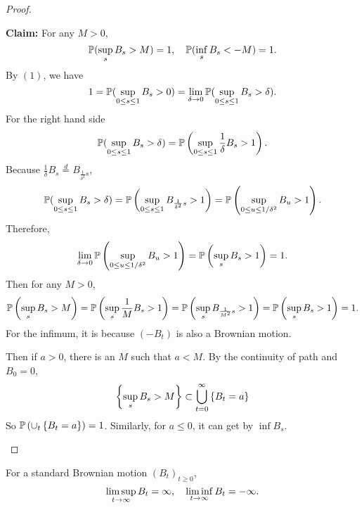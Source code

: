 \begin{proof}
\begin{enumerate}[label=(\arabic{*})]
        \noindent \textbf{Claim:} For any $M > 0$,
        \begin{equation*}
            \mathbb{P}(\sup_s B_s > M) = 1,\quad \mathbb{P}(\inf_s B_s < -M) = 1.
        \end{equation*}
        By $(1)$, we have
        \begin{equation*}
            1 = \mathbb{P}(\sup_{0 \leq s \leq 1} B_s > 0) = \lim_{\delta \rightarrow 0} \mathbb{P}(\sup_{0 \leq s \leq 1} B_s > \delta).
        \end{equation*}
        For the right hand side
        \begin{equation*}
            \mathbb{P}(\sup_{0 \leq s \leq 1} B_s > \delta) = \mathbb{P}\left(\sup_{0 \leq s \leq 1} \frac{1}{\delta} B_s > 1\right).
        \end{equation*}
        Because $\frac{1}{\delta} B_s \stackrel{d}{=} B_{\frac{1}{\delta^2}s}$,
        \begin{equation*}
            \mathbb{P}(\sup_{0 \leq s \leq 1} B_s > \delta) = \mathbb{P}\left(\sup_{0 \leq s \leq 1} B_{\frac{1}{\delta^2}s} > 1\right) = \mathbb{P}\left(\sup_{0 \leq u \leq {1}/{\delta^2}} B_{u} > 1\right).
        \end{equation*}
        Therefore,
        \begin{equation*}
            \lim_{\delta \rightarrow 0} \mathbb{P}\left(\sup_{0 \leq u \leq {1}/{\delta^2}} B_{u} > 1\right) = \mathbb{P}\left(\sup_s B_s > 1\right) = 1.
        \end{equation*}
        Then for any $M > 0$, 
        \begin{equation*}
            \mathbb{P}\left(\sup_s B_s > M\right) = \mathbb{P}\left(\sup_s \frac{1}{M}B_s > 1\right) = \mathbb{P}\left(\sup_s B_{\frac{1}{M^2}s} > 1\right) =  \mathbb{P}\left(\sup_s B_s > 1\right) = 1.
        \end{equation*}
        For the infimum, it is because $(-B_t)$ is also a Brownian motion.


        \noindent Then if $a > 0$, there is an $M$ such that $a < M$. By the continuity of path and $B_0 = 0$,
        \begin{equation*}
            \left\{\sup_s B_s > M\right\} \subset \bigcup_{t=0}^\infty \left\{B_t = a\right\}
        \end{equation*}
        So $\mathbb{P}\left(\cup_{t} \left\{B_t = a\right\}\right) = 1$. Similarly, for $a \leq 0$, it can get by $\inf B_s$. \qedhere
    \end{enumerate}
\end{proof}
\begin{cor}
    For a standard Brownian motion $(B_t)_{t \geq 0}$,
    \begin{equation*}
        \limsup_{t \rightarrow \infty} B_t = \infty,\quad \liminf_{t \rightarrow \infty} B_t = -\infty.
    \end{equation*}
\end{cor}


